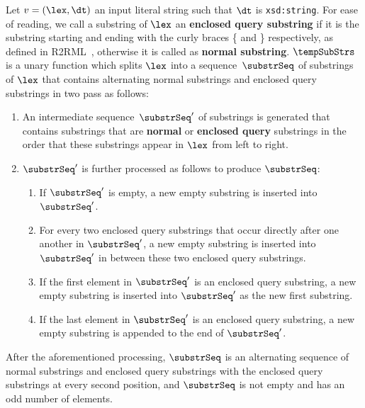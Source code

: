 \break
\begin{definition}
    \label{def:tempSubStrs}
    Let $v = (\lex, \dt)$ an input literal string such that $\dt$ is \texttt{xsd:string}.  
    For ease of reading, we call a substring of $\lex$ an \textbf{enclosed query substring} 
    if it is the substring starting and ending with the curly braces \{ and \} respectively, as defined in R2RML~\citeneeded, 
    otherwise it is called as \textbf{normal substring}.
    $\tempSubStrs$ is a unary function which splits $\lex$ into a sequence~$\substrSeq$
    of substrings of $\lex$ that contains alternating normal substrings and
    enclosed query substrings in two pass as follows: 

    \begin{enumerate}
        \item  An intermediate sequence~$\substrSeq'$ of substrings is generated that 
            contains substrings that are \textbf{normal} or \textbf{enclosed query}  
            substrings in the order that these substrings appear in $\lex$ from 
            left to right. 
        \item $\substrSeq'$ is further processed as follows to produce $\substrSeq$: 
            \begin{enumerate}
                \item If $\substrSeq'$ is empty, a new empty substring is inserted into $\substrSeq'$.
                \item For every two enclosed query substrings that occur directly after one another in $\substrSeq'$, a new empty substring is inserted into $\substrSeq'$ in between these two enclosed query substrings.
                \item If the first element in $\substrSeq'$ is an enclosed query substring, 
                    a new empty substring is inserted into $\substrSeq'$ as the new first substring.
                \item If the last element in $\substrSeq'$ is an enclosed query substring, 
                    a new empty substring is appended to the end of $\substrSeq'$.
            \end{enumerate}
    \end{enumerate}
\end{definition}

After the aforementioned processing, $\substrSeq$ is an
alternating sequence of normal substrings and enclosed query substrings
with the enclosed query substrings at every second position, and $\substrSeq$ 
is not empty and has an odd number of elements.


